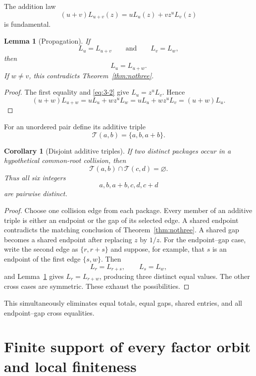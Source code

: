 \documentclass[11pt]{article}
\numberwithin{equation}{section}
\newtheorem{lemma}[theorem]{Lemma}
\newtheorem{corollary}[theorem]{Corollary}
\theoremstyle{definition}
\newcommand{\T}{\mathcal T}
\begin{document}
The addition law
\begin{equation}
 (u+v)L_{u+v}(z)=uL_u(z)+vz^uL_v(z)
 \label{eq:3-2}
\end{equation}
is fundamental.

\begin{lemma}[Propagation]\label{lem:propagation}
If
\[
 L_u=L_{u+v}
 \qquad\text{and}\qquad
 L_v=L_w,
\]
then
\[
 L_u=L_{u+w}.
\]
If \(w\neq v\), this contradicts Theorem~\ref{thm:nothree}.
\end{lemma}

\begin{proof}
The first equality and \eqref{eq:3-2} give \(L_u=z^uL_v\).  Hence
\[
 (u+w)L_{u+w}=uL_u+wz^uL_w
 =uL_u+wz^uL_v=(u+w)L_u.
\]
\end{proof}

For an unordered pair define its additive triple
\[
 \T(a,b)=\{a,b,a+b\}.
\]

\begin{corollary}[Disjoint additive triples]\label{cor:triples}
If two distinct packages occur in a hypothetical common-root collision, then
\begin{equation}
 \T(a,b)\cap\T(c,d)=\varnothing.
 \label{eq:3-3}
\end{equation}
Thus all six integers
\[
 a,b,a+b,c,d,c+d
\]
are pairwise distinct.
\end{corollary}

\begin{proof}
Choose one collision edge from each package.  Every member of an additive
triple is either an endpoint or the gap of its selected edge.  A shared
endpoint contradicts the matching conclusion of Theorem~\ref{thm:nothree}.
A shared gap becomes a shared endpoint after replacing \(z\) by \(1/z\).
For the endpoint--gap case, write the second edge as
\(\{r,r+s\}\) and suppose, for example, that \(s\) is an endpoint of
the first edge \(\{s,w\}\).  Then
\[
 L_r=L_{r+s},\qquad L_s=L_w,
\]
and Lemma~\ref{lem:propagation} gives \(L_r=L_{r+w}\), producing three
distinct equal values.  The other cross cases are symmetric.  These exhaust
the possibilities.
\end{proof}

This simultaneously eliminates equal totals, equal gaps, shared entries, and
all endpoint--gap cross equalities.

\section{Finite support of every factor orbit and local finiteness}
\label{sec:finite-support}
\end{document}
